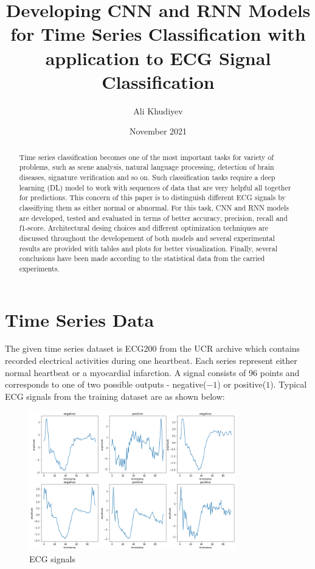 \documentclass[a4paper]{article}
\title{Developing CNN and RNN Models for Time Series Classification with application to ECG Signal Classification}
\author{Ali Khudiyev}
\date{November 2021}
\begin{document}
\maketitle

\begin{abstract}
	Time series classification becomes one of the most important tasks for variety of problems, such as scene analysis, natural language processing, detection of brain diseases, signature verification 
	and so on. Such classification tasks require a deep learning (DL) model to work with sequences of data that are very helpful all together for predictions. This concern of this paper is to 
	distinguish different ECG signals by classifiying them as either normal or abnormal. For this task, CNN and RNN models are developed, tested and evaluated in terms of better accuracy, precision, 
	recall and f1-score. Architectural desing choices and different optimization techniques are discussed throughout the developement of both models and several experimental results are provided with 
	tables and plots for better visualization. Finally, several conclusions have been made according to the statistical data from the carried experiments.
\end{abstract}

\section{Time Series Data}
The given time series dataset is ECG200 from the UCR archive which contains recorded electrical activities during one heartbeat. Each series represent either normal heartbeat or a myocardial infarction. 
A signal consists of 96 points and corresponds to one of two possible outputs - negative($-1$) or positive($1$). Typical ECG signals from the training dataset are as shown below:

\begin{figure}[h]
	\centering
	\includegraphics[width=0.8\textwidth]{img/ecg_signals.png}
	\caption{ECG signals}
	\label{fig:signals}
\end{figure}
\end{document}
